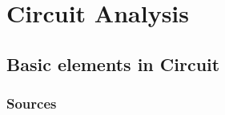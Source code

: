 \documentclass[UTF8]{article}
\begin{document}
 


\tableofcontents

\newpage
\section{Circuit Analysis}
\subsection{Basic elements in Circuit}
\subsubsection{Sources}
\end{document}
